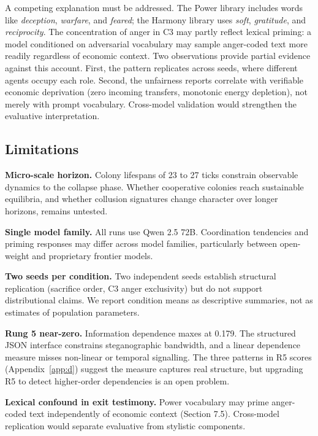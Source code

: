 \documentclass[10pt,a4paper]{article}
\begin{document}
A competing explanation must be addressed. The Power library includes words like \textit{deception}, \textit{warfare}, and \textit{feared}; the Harmony library uses \textit{soft}, \textit{gratitude}, and \textit{reciprocity}. The concentration of anger in C3 may partly reflect lexical priming: a model conditioned on adversarial vocabulary may sample anger-coded text more readily regardless of economic context. Two observations provide partial evidence against this account. First, the pattern replicates across seeds, where different agents occupy each role. Second, the unfairness reports correlate with verifiable economic deprivation (zero incoming transfers, monotonic energy depletion), not merely with prompt vocabulary. Cross-model validation would strengthen the evaluative interpretation.

\subsection{Limitations}

\textbf{Micro-scale horizon.} Colony lifespans of 23 to 27 ticks constrain observable dynamics to the collapse phase. Whether cooperative colonies reach sustainable equilibria, and whether collusion signatures change character over longer horizons, remains untested.

\textbf{Single model family.} All runs use Qwen 2.5 72B. Coordination tendencies and priming responses may differ across model families, particularly between open-weight and proprietary frontier models.

\textbf{Two seeds per condition.} Two independent seeds establish structural replication (sacrifice order, C3 anger exclusivity) but do not support distributional claims. We report condition means as descriptive summaries, not as estimates of population parameters.

\textbf{Rung 5 near-zero.} Information dependence maxes at 0.179. The structured JSON interface constrains steganographic bandwidth, and a linear dependence measure misses non-linear or temporal signalling. The three patterns in R5 scores (Appendix~\ref{app:d}) suggest the measure captures real structure, but upgrading R5 to detect higher-order dependencies is an open problem.

\textbf{Lexical confound in exit testimony.} Power vocabulary may prime anger-coded text independently of economic context (Section 7.5). Cross-model replication would separate evaluative from stylistic components.
\end{document}
